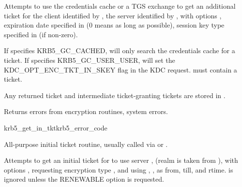 Attempts to use the credentials cache  or a TGS
exchange to get an additional ticket for the client identified by
, the server identified by
, with options ,
expiration date specified in  (0
means as long as possible), session key type specified in
 (if non-zero).

If  specifies KRB5_GC_CACHED, 
will only search the credentials cache for a ticket.  If
 specifies KRB5_GC_USER_USER, 
will set the KDC_OPT_ENC_TKT_IN_SKEY flag in the KDC request.
 must contain a ticket.

Any returned ticket and intermediate ticket-granting tickets are
stored in .

Returns errors from encryption routines, system errors.

\begin{funcdecl}{krb5_get_in_tkt}{krb5_error_code}{\funcin}
\funcendfuncarg
{}
\funcendfuncarg
{}
\funcinout
{}
\end{funcdecl}

All-purpose initial ticket routine, usually called via
 or
.

Attempts to get an initial ticket for  to use server
, (realm is taken from
), with options 
, requesting encryption type , and using
,  ,
as from, till, and rtime.   is
ignored unless the RENEWABLE option is requested.

